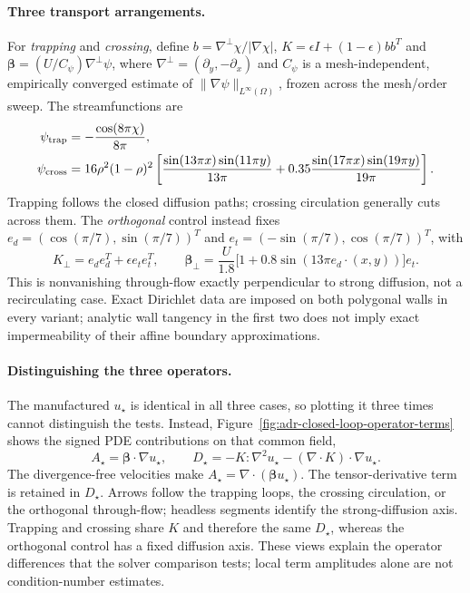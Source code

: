 \paragraph{Three transport arrangements.}
For \emph{trapping} and \emph{crossing}, define
$b=\nabla^\perp\chi/|\nabla\chi|$,
$K=\epsilon I+(1-\epsilon)bb^T$ and
$\boldsymbol\beta=(U/C_\psi)\nabla^\perp\psi$, where
$\nabla^\perp=(\partial_y,-\partial_x)$ and $C_\psi$ is a
mesh-independent, empirically converged estimate of
$\|\nabla\psi\|_{L^\infty(\Omega)}$, frozen across the mesh/order sweep.
The streamfunctions are
\begin{align}
 \psi_{\rm trap}&=-\frac{\cos(8\pi\chi)}{8\pi},\label{eq:adr-closed-loop-trap}\\
 \psi_{\rm cross}&=16\rho^2(1-\rho)^2\left[
 \frac{\sin(13\pi x)\sin(11\pi y)}{13\pi}
 +0.35\frac{\sin(17\pi x)\sin(19\pi y)}{19\pi}\right].
 \label{eq:adr-closed-loop-cross}
\end{align}
Trapping follows the closed diffusion paths; crossing circulation generally
cuts across them. The \emph{orthogonal} control instead fixes
$e_d=(\cos(\pi/7),\sin(\pi/7))^T$ and
$e_t=(-\sin(\pi/7),\cos(\pi/7))^T$, with
\begin{equation}
 K_\perp=e_de_d^T+\epsilon e_te_t^T,\qquad
 \boldsymbol\beta_\perp=
 \frac{U}{1.8}\bigl[1+0.8\sin(13\pi e_d\cdot(x,y))\bigr]e_t.
 \label{eq:adr-closed-loop-orthogonal}
\end{equation}
This is nonvanishing through-flow exactly perpendicular to strong diffusion,
not a recirculating case. Exact Dirichlet data are imposed on both polygonal
walls in every variant; analytic wall tangency in the first two does not
imply exact impermeability of their affine boundary approximations.

\paragraph{Distinguishing the three operators.}
The manufactured $u_\star$ is identical in all three cases, so plotting it
three times cannot distinguish the tests. Instead,
Figure~\ref{fig:adr-closed-loop-operator-terms} shows the signed PDE
contributions on that common field,
\[
 A_\star=\boldsymbol\beta\cdot\nabla u_\star,\qquad
 D_\star=-K:\nabla^2u_\star-(\nabla\cdot K)\cdot\nabla u_\star.
\]
The divergence-free velocities make $A_\star=\nabla\cdot(\boldsymbol\beta u_\star)$.
The tensor-derivative term is retained in $D_\star$.
Arrows follow the trapping loops, the crossing circulation, or the
orthogonal through-flow; headless segments identify the strong-diffusion
axis. Trapping and crossing share $K$ and therefore the same $D_\star$,
whereas the orthogonal control has a fixed diffusion axis.
These views explain the operator differences that the solver comparison
tests; local term amplitudes alone are not condition-number estimates.

